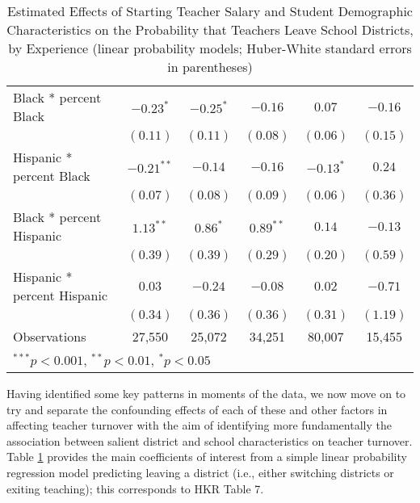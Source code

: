 \documentclass[]{article}
\begin{document}
\begin{table}
\begin{center}
\begin{tabular}{l c c c c c }
\quad Black * percent Black                 & $-0.23^{*}$  & $-0.25^{*}$  & $-0.16$      & $0.07$       & $-0.16$      \\
                                            & $(0.11)$     & $(0.11)$     & $(0.08)$     & $(0.06)$     & $(0.15)$     \\
\quad Hispanic * percent Black              & $-0.21^{**}$ & $-0.14$      & $-0.16$      & $-0.13^{*}$  & $0.24$       \\
                                            & $(0.07)$     & $(0.08)$     & $(0.09)$     & $(0.06)$     & $(0.36)$     \\
\quad Black * percent Hispanic              & $1.13^{**}$  & $0.86^{*}$   & $0.89^{**}$  & $0.14$       & $-0.13$      \\
                                            & $(0.39)$     & $(0.39)$     & $(0.29)$     & $(0.20)$     & $(0.59)$     \\
\quad Hispanic * percent Hispanic           & $0.03$       & $-0.24$      & $-0.08$      & $0.02$       & $-0.71$      \\
                                            & $(0.34)$     & $(0.36)$     & $(0.36)$     & $(0.31)$     & $(1.19)$     \\
\hline
Observations                                & 27,550        & 25,072        & 34,251        & 80,007        & 15,455        \\
\hline
\multicolumn{6}{l}{\scriptsize{$^{***}p<0.001$, $^{**}p<0.01$, $^*p<0.05$}}
\end{tabular}
\caption{Estimated Effects of Starting Teacher Salary and Student Demographic Characteristics on the Probability that Teachers Leave School Districts, by Experience (linear probability models; Huber-White standard  errors in parentheses)}
\label{tbl:reg_lpm}
\end{center}
\end{table}

Having identified some key patterns in moments of the data, we now move
on to try and separate the confounding effects of each of these and
other factors in affecting teacher turnover with the aim of identifying
more fundamentally the association between salient district and school
characteristics on teacher turnover. Table \ref{tbl:reg_lpm} provides
the main coefficients of interest from a simple linear probability
regression model predicting leaving a district (i.e., either switching
districts or exiting teaching); this corresponds to HKR Table 7.
\end{document}
